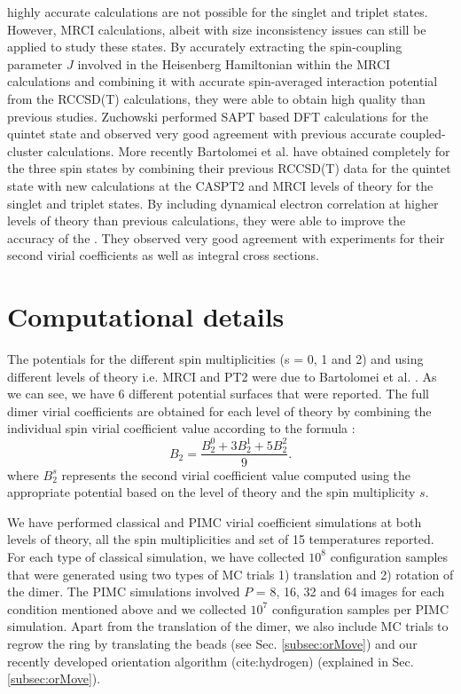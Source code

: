highly accurate calculations are not possible for the singlet and triplet states. However, MRCI calculations, albeit with size inconsistency issues can still be applied to study these states. By accurately extracting the spin-coupling parameter $J$ involved in the Heisenberg Hamiltonian within the MRCI calculations and combining it with accurate spin-averaged interaction potential from the RCCSD(T) calculations, they were able to obtain high quality \PESs{} than previous studies. Zuchowski \cite{Zuchowski2008} performed SAPT based DFT calculations for the quintet state and observed very good agreement with previous accurate \abinitio{} coupled-cluster calculations. More recently Bartolomei et al. \cite{Bartolomei2010} have obtained completely \abinitio{} \PESs{} for the three spin states by combining their previous RCCSD(T) data \cite{Bartolomei2008} for the quintet state with new \abinitio{} calculations at the CASPT2 and MRCI levels of theory for the singlet and triplet states. By including dynamical electron correlation at higher levels of theory than previous calculations, they were able to improve the accuracy of the \PESs{}. They observed very good agreement with experiments for their second virial coefficients as well as integral cross sections.
\section{Computational details}
    The \abinitio{} potentials for the different spin multiplicities (s = 0, 1 and 2) and using different levels of theory i.e. MRCI and PT2 were due to Bartolomei et al. \cite{Bartolomei2010}. As we can see, we have 6 different potential surfaces that were reported. The full dimer virial coefficients are obtained for each level of theory by combining the individual spin virial coefficient value according to the formula \cite{Aquilanti1999,Bartolomei2010}:
    \begin{equation}
        \label{eq:o2combination}
        B_2 = \frac{B_2^0 + 3 B_2^1 + 5 B_2^2}{9}.
    \end{equation}
    where $B_2^s$ represents the second virial coefficient value computed using the appropriate potential based on the level of theory and the spin multiplicity $s$.

    We have performed classical and PIMC virial coefficient simulations at both levels of theory, all the spin multiplicities and set of 15 temperatures reported. For each type of classical simulation, we have collected $10^8$ configuration samples that were generated using two types of MC trials 1) translation and 2) rotation of the dimer. The PIMC simulations involved $P$ = 8, 16, 32 and 64 images for each condition mentioned above and we collected $10^7$ configuration samples per PIMC simulation. Apart from the translation of the dimer, we also include MC trials to regrow the ring by translating the beads (see Sec. \ref{subsec:orMove}) and our recently developed orientation algorithm (cite:hydrogen) (explained in Sec. \ref{subsec:orMove}).

